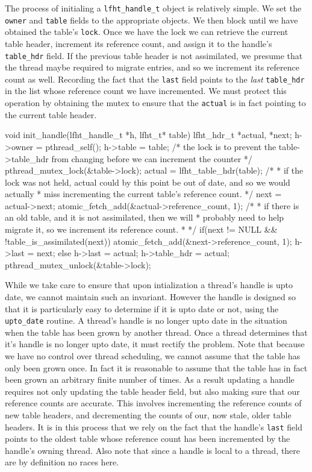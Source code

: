 The process of initialing a \texttt{lfht\_handle\_t} object is relatively simple.
We set the \texttt{owner} and  \texttt{table} fields to the appropriate objects.
We then block until we have obtained the table's \texttt{lock}. Once we have the lock
we can retrieve the current table header, increment its reference count, and
assign it to the handle's \texttt{table\_hdr} field. If the previous table header
is not assimilated, we presume that the thread maybe required to migrate entries,
and so we increment its reference count as well. Recording the fact that
the \texttt{last} field points to the {\em last}  \texttt{table\_hdr} in the list
whose reference count we have incremented.
We must protect this operation by obtaining the mutex to ensure that the \texttt{actual}
is in fact pointing to the current table header.


\begin{center}
\begin{clisting}
void init_handle(lfht_handle_t *h, lfht_t* table){
  lfht_hdr_t *actual, *next;
  h->owner = pthread_self();
  h->table = table;
  /* the lock is to prevent the table->table_hdr from changing before we can increment the counter */
  pthread_mutex_lock(&table->lock);
  actual = lfht_table_hdr(table);
  /*
   * if the lock was not held, actual could by this point be out of date, and so we would actually
   * miss incrementing the current table's reference count.
   */
  next = actual->next;
  atomic_fetch_add(&actual->reference_count, 1);
  /* 
   * if there is an old table, and it is not assimilated, then we will
   * probably need to help migrate it, so we increment its reference count.
   *
   */
  if(next != NULL && !table_is_assimilated(next)){
    atomic_fetch_add(&next->reference_count, 1);
    h->last = next;
  } else {
    h->last = actual;
  }
  h->table_hdr = actual;
  pthread_mutex_unlock(&table->lock);
}
\end{clisting}
\end{center}

While we take care to ensure that upon intialization a thread's handle is upto date,
we cannot maintain such an invariant. However the handle is designed so that it is particularly
easy to determine if it is upto date or not, using the  \texttt{upto\_date} routine.
A thread's handle is no longer upto date in the situation when the table has been grown by another thread.
Once a thread determines that it's handle is no longer upto date, it must rectify the problem.
Note that because we have no control over thread scheduling, we cannot assume that
the table has only been grown once. In fact it is reasonable to assume that the table
has in fact been grown an arbitrary finite number of times. As a result updating
a handle requires not only updating the table header field, but also making sure
that our reference counts are accurate. This involves incrementing the reference counts
of new table headers, and decrementing the counts of our, now stale, older table headers.
It is in this process that we rely on the fact that the handle's \texttt{last} field
points to the oldest table whose reference count has been incremented by the handle's owning thread.
Also note that since a handle is local to a thread, there are by definition no races here.

